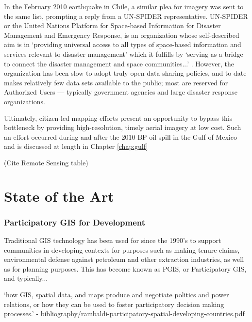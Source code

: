 \documentclass[11pt,oneside,notitlepage]{report}
\begin{document}
In the February 2010 earthquake in Chile, a similar plea for imagery was sent to the same list, prompting a reply from a UN-SPIDER representative. UN-SPIDER or the United Nations Platform for Space-based Information for Disaster Management and Emergency Response, is an organization whose self-described aim is in `providing universal access to all types of space-based information and services relevant to disaster management' which it fulfills by `serving as a bridge to connect the disaster management and space communities...' \cite{unspider2010aims}. However, the organization has been slow to adopt truly open data sharing policies, and to date makes relatively few data sets available to the public; most are reserved for Authorized Users --- typically government agencies and large disaster response organizations. \cite{charter2010brochure}  

Ultimately, citizen-led mapping efforts present an opportunity to bypass this bottleneck by providing high-resolution, timely aerial imagery at low cost. Such an effort occurred during and after the 2010 BP oil spill in the Gulf of Mexico and is discussed at length in Chapter \ref{chap:gulf} 

(Cite Remote Sensing table)


\chapter{State of the Art}

\subsection{Participatory GIS for Development}
\label{subsec:pgis}

Traditional GIS technology has been used for since the 1990's to support communities in developing contexts for purposes such as making tenure claims, environmental defense against petroleum and other extraction industries, as well as for planning purposes. This has become known as PGIS, or Participatory GIS, and typically... 


`how GIS, spatial data, and maps produce and negotiate politics and power relations, or how they can be used to foster participatory decision making processes.' -  bibliography/rambaldi-participatory-spatial-developing-countries.pdf
\end{document}
